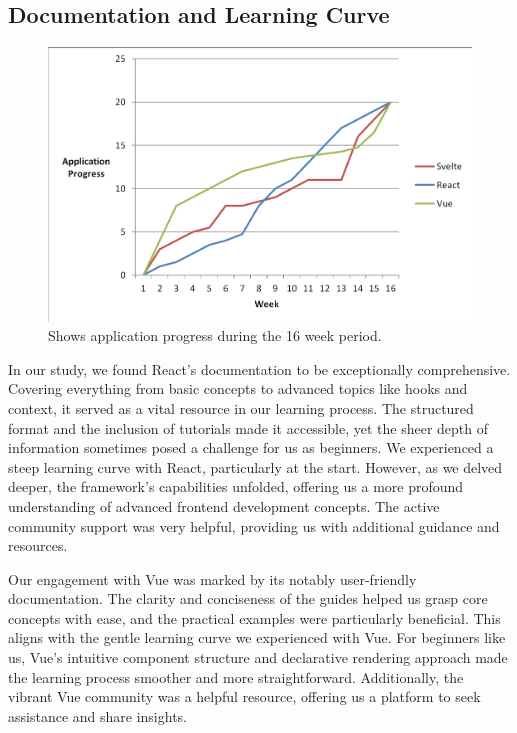 \subsection{Documentation and Learning Curve}

\begin{figure}[!htbp]
\centering
\includegraphics[width=\linewidth]{figs/progress.png}
\caption{Shows application progress during the 16 week period.}
\label{fig:progress}
\end{figure}

In our study, we found React's documentation to be exceptionally comprehensive. Covering everything from basic concepts to advanced topics like hooks and context, it served as a vital resource in our learning process. The structured format and the inclusion of tutorials made it accessible, yet the sheer depth of information sometimes posed a challenge for us as beginners. We experienced a steep learning curve with React, particularly at the start. However, as we delved deeper, the framework's capabilities unfolded, offering us a more profound understanding of advanced frontend development concepts. The active community support was very helpful, providing us with additional guidance and resources.

Our engagement with Vue was marked by its notably user-friendly documentation. The clarity and conciseness of the guides helped us grasp core concepts with ease, and the practical examples were particularly beneficial. This aligns with the gentle learning curve we experienced with Vue. For beginners like us, Vue's intuitive component structure and declarative rendering approach made the learning process smoother and more straightforward. Additionally, the vibrant Vue community was a helpful resource, offering us a platform to seek assistance and share insights.

